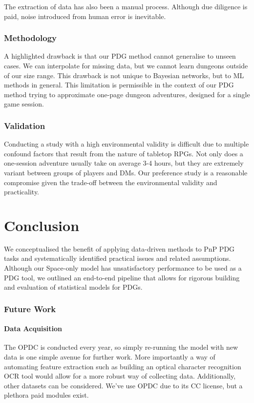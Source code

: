 \documentclass{UoYCSproject}
\begin{document}
The extraction of data has also been a manual process. Although due diligence is paid, noise introduced from human error is inevitable.

\subsection{Methodology}
A highlighted drawback is that our PDG method cannot generalise to unseen cases. We can interpolate for missing data, but we cannot learn dungeons outside of our size range. This drawback is not unique to Bayesian networks, but to ML methods in general. This limitation is permissible in the context of our PDG method trying to approximate one-page dungeon adventures, designed for a single game session.

\subsection{Validation}
Conducting a study with a high environmental validity is difficult due to multiple confound factors that result from the nature of tabletop RPGs. Not only does a one-session adventure usually take on average 3-4 hours, but they are extremely variant between groups of players and DMs. Our preference study is a reasonable compromise given the trade-off between the environmental validity and practicality.



\chapter{Conclusion}
\label{cha:conclusion}
We conceptualised the benefit of applying data-driven methods to PnP PDG tasks and systematically identified practical issues and related assumptions. Although our Space-only model has unsatisfactory performance to be used as a PDG tool, we outlined an end-to-end pipeline that allows for rigorous building and evaluation of statistical models for PDGs. 

\subsection{Future Work}

\subsubsection{Data Acquisition}
The OPDC is conducted every year, so simply re-running the model with new data is one simple avenue for further work. More importantly a way of automating feature extraction such as building an optical character recognition OCR tool would allow for a more robust way of collecting data. Additionally, other datasets can be considered. We've use OPDC due to its CC license, but a plethora paid modules exist.
\end{document}
